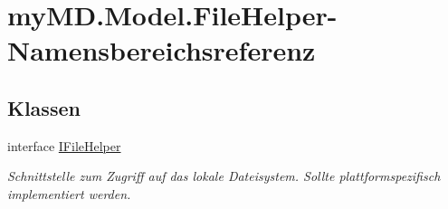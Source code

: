 \hypertarget{namespacemy_m_d_1_1_model_1_1_file_helper}{}\section{my\+M\+D.\+Model.\+File\+Helper-\/\+Namensbereichsreferenz}
\label{namespacemy_m_d_1_1_model_1_1_file_helper}
\subsection*{Klassen}
\begin{DoxyCompactItemize}
\item 
interface \mbox{\hyperlink{interfacemy_m_d_1_1_model_1_1_file_helper_1_1_i_file_helper}{I\+File\+Helper}}
\begin{DoxyCompactList}\small\item\em Schnittstelle zum Zugriff auf das lokale Dateisystem. Sollte plattformspezifisch implementiert werden. \end{DoxyCompactList}\end{DoxyCompactItemize}
